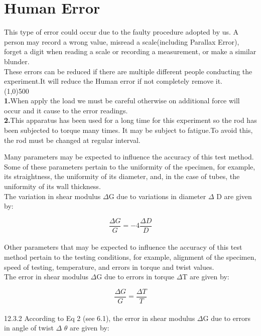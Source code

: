 \documentclass[12pt,a4paper]{article}	%
\begin{document}
	\section{Human Error} This type of error could occur due to the faulty procedure	adopted by us. A person may record a wrong value, misread a scale(including Parallax Error), forget a digit when reading a scale or recording a measurement, or make a similar blunder.
	\\These errors can be reduced if there are multiple different people conducting the experiment.It will reduce the Human error if not completely remove it.\\
 	\line(1,0){500}\\
	\textbf{1.}When apply the load we must be careful otherwise on additional force will occur and it cause to the error readings.\\
	\textbf{2.}This apparatus has been used for a long time for this experiment so the rod has been subjected to torque many times. It may be subject to fatigue.To avoid this, the rod must be changed at regular interval.
		
	\thispagestyle{empty}	%
	
	\pagebreak
	
	Many parameters may be expected to influence the accuracy of this test method. Some of these parameters pertain to the uniformity of the specimen, for example, its straightness, the uniformity of its diameter, and, in the case of tubes, the uniformity of its wall thickness.\\
	
	The variation in shear modulus $\Delta$G due to variations in diameter $\Delta$ D are given by:
	
	\[ \frac{\Delta G}{G} = -4 \frac{\Delta D}{D}\] \\

	
	Other parameters that may be expected to influence the accuracy of this test method pertain to the testing conditions, for example, alignment of the specimen, speed of testing, temperature, and errors in torque and twist values.\\
	
	The error in shear modulus $\Delta$G due to errors in torque $\Delta$T are given by:
	
	\[ \frac{\Delta G}{G} = \frac{\Delta T}{T} \] \\
	
	
	
	12.3.2 According to Eq 2 (see 6.1), the error in shear modulus $\Delta$G due to errors in angle of twist $\Delta$ $\theta$ are given by:
	
\end{document}
